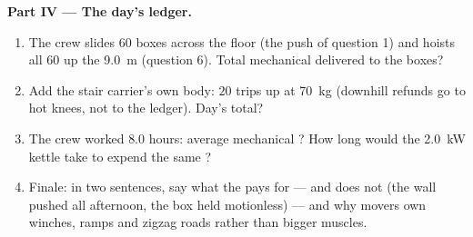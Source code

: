 \begin{problem}
\medskip
\noindent\textbf{Part IV --- The day's ledger.}
\begin{enumerate}[resume]
  \item The crew slides $60$ boxes across the floor (the push of
        question 1) and hoists all $60$ up the \qty{9.0}{m}
        (question 6). Total mechanical  delivered to the boxes?
  \item Add the stair carrier's own body: $20$ trips up at \qty{70}{kg}
        (downhill refunds go to hot knees, not to the ledger). Day's
        total?
  \item The crew worked $8.0$ hours: average mechanical ? How long
        would the \qty{2.0}{kW} kettle take to expend the same ?
  \item Finale: in two sentences, say what the  pays for --- and
        does not (the wall pushed all afternoon, the box held
        motionless) --- and why movers own winches, ramps and zigzag
        roads rather than bigger muscles.
\end{enumerate}
\end{problem}
